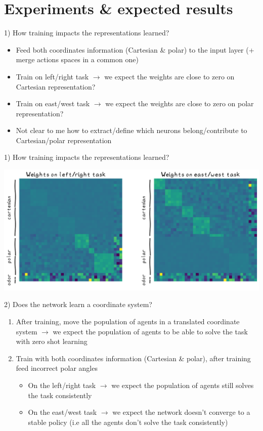 \documentclass[bigger]{beamer}
\begin{document}
\section{Experiments \& expected results  }
\label{sec:orgca6f00f}
\begin{frame}[<+->][label={sec:org772cab1}]{1) How training impacts the representations learned?}
\begin{itemize}
\item Feed both coordinates information (Cartesian \& polar) to the input layer (+ merge actions spaces in a common one)
\item Train on left/right task \(\to\) we expect the weights are close to zero on Cartesian representation?
\item Train on east/west task \(\to\) we expect the weights are close to zero on polar representation?
\item Not clear to me how to extract/define which neurons belong/contribute to Cartesian/polar representation
\end{itemize}
\end{frame}
\begin{frame}[label={sec:orga34032d}]{1) How training impacts the representations learned?}
\begin{center}
\includegraphics[width=.9\linewidth]{img/exp1-weights-heatmap.png}
\end{center}
\end{frame}
\begin{frame}[<+->][label={sec:org8e0c19d}]{2) Does the network learn a coordinate system?}
\begin{enumerate}
\item After training, move the population of agents in a translated coordinate system
\(\to\) we expect the population of agents to be able to solve the task with zero shot learning
\item Train with both coordinates information (Cartesian \& polar), after training feed incorrect polar angles
\begin{itemize}
\item On the left/right task \(\to\) we expect the population of agents still solves the task consistently
\item On the east/west task \(\to\) we expect the network doesn't converge to a stable policy (i.e all the agents don't solve the task consistently)
\end{itemize}
\end{enumerate}
\end{frame}
\end{document}
